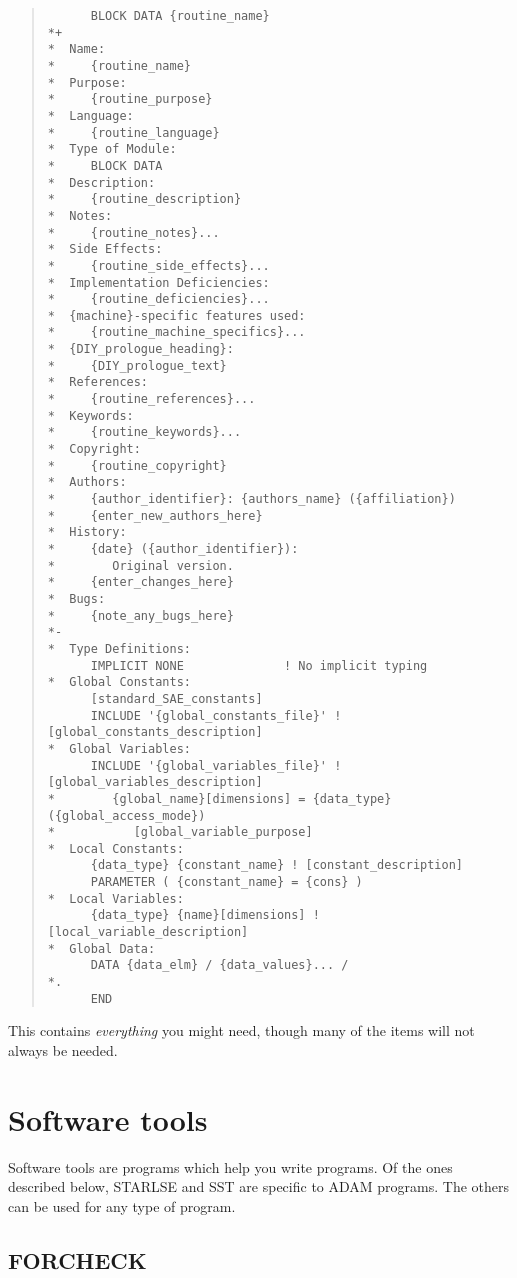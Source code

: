 \begin{quote}

\begin{small}
\begin{verbatim}
      BLOCK DATA {routine_name}
*+
*  Name:
*     {routine_name}
*  Purpose:
*     {routine_purpose}
*  Language:
*     {routine_language}
*  Type of Module:
*     BLOCK DATA
*  Description:
*     {routine_description}
*  Notes:
*     {routine_notes}...
*  Side Effects:
*     {routine_side_effects}...
*  Implementation Deficiencies:
*     {routine_deficiencies}...
*  {machine}-specific features used:
*     {routine_machine_specifics}...
*  {DIY_prologue_heading}:
*     {DIY_prologue_text}
*  References:
*     {routine_references}...
*  Keywords:
*     {routine_keywords}...
*  Copyright:
*     {routine_copyright}
*  Authors:
*     {author_identifier}: {authors_name} ({affiliation})
*     {enter_new_authors_here}
*  History:
*     {date} ({author_identifier}):
*        Original version.
*     {enter_changes_here}
*  Bugs:
*     {note_any_bugs_here}
*-
*  Type Definitions:
      IMPLICIT NONE              ! No implicit typing
*  Global Constants:
      [standard_SAE_constants]
      INCLUDE '{global_constants_file}' ! [global_constants_description]
*  Global Variables:
      INCLUDE '{global_variables_file}' ! [global_variables_description]
*        {global_name}[dimensions] = {data_type} ({global_access_mode})
*           [global_variable_purpose]
*  Local Constants:
      {data_type} {constant_name} ! [constant_description]
      PARAMETER ( {constant_name} = {cons} )
*  Local Variables:
      {data_type} {name}[dimensions] ! [local_variable_description]
*  Global Data:
      DATA {data_elm} / {data_values}... /
*.
      END
\end{verbatim}
\end{small}

\end{quote}
This contains {\em everything} you might need, though many of the items will
not always be needed.

\section{Software tools}
\label{S_softools}

Software tools are programs which help you write programs.
Of the ones described below, STARLSE and SST are specific to ADAM programs.
The others can be used for any type of program.

\subsection{FORCHECK}

